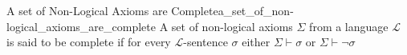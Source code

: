 \begin{definition}{A set of Non-Logical Axioms are
Complete}{a_set_of_non-logical_axioms_are_complete}
A set of non-logical axioms \( \Sigma  \) from a language \( \mathcal{ L }   \)
is said to be complete if for every \( \mathcal{ L }   \)-sentence \( \sigma  \)
either \( \Sigma \vdash \sigma  \) or \( \Sigma  \vdash \neg \sigma  \) 
\end{definition}
